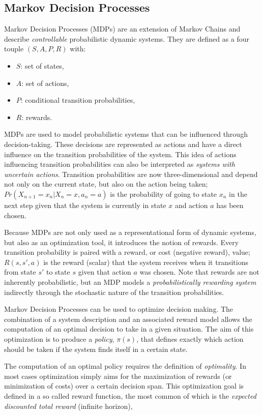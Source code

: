 \subsection{Markov Decision Processes}
\label{subsec:mdp}

Markov Decision Processes (MDPs) are an extension of Markov Chains and describe \textit{controllable} probabilistic dynamic systems. They are defined as a four touple $(S,A,P,R)$ with:
\begin{itemize}
\item $S$: set of states,
\item $A$: set of actions,
\item $P$: conditional transition probabilities,
\item $R$: rewards.
\end{itemize}

MDPs are used to model probabilistic systems that can be influenced through decision-taking. These decisions are represented as actions and have a direct influence on the transition probabilities of the system. This idea of actions influencing transition probabilities can also be interpreted as \textit{systems with uncertain actions}. Transition probabilities are now three-dimensional and depend not only on the current state, but also on the action being taken; $Pr(X_{n+1}=x_n|X_n=x,a_n=a)$ is the probability of going to state $x_n$ in the next step given that the system is currently in state $x$ and action $a$ has been chosen.

Because MDPs are not only used as a representational form of dynamic systems, but also as an optimization tool, it introduces the notion of rewards. Every transition probability is paired with a reward, or cost (negative reward), value; $R(s,s',a)$ is the reward (scalar) that the system receives when it transitions from state $s'$ to state $s$ given that action $a$ was chosen. Note that rewards are not inherently probabilistic, but an MDP models a \textit{probabilistically rewarding system} indirectly through the stochastic nature of the transition probabilities.

Markov Decision Processes can be used to optimize decision making. The combination of a system description and an associated reward model allows the computation of an optimal decision to take in a given situation. The aim of this optimization is to produce a \textit{policy}, $\pi(s)$, that defines exactly which action should be taken if the system finds itself in a certain state.

The computation of an optimal policy requires the definition of \textit{optimality}. In most cases optimization simply aims for the maximization of rewards (or minimization of costs) over a certain decision span. This optimization goal is defined in a so called reward function, the most common of which is the \textit{expected discounted total reward} (infinite horizon),

